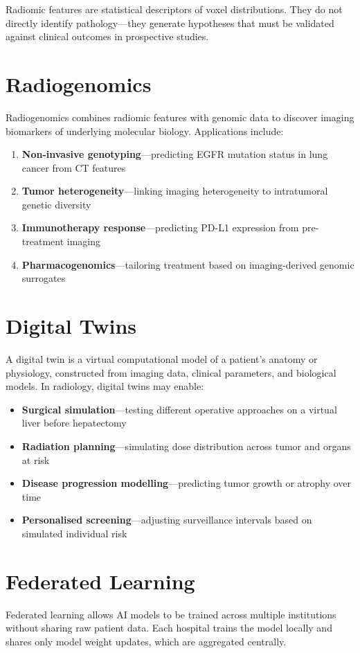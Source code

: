 \begin{pearlbox}
Radiomic features are statistical descriptors of voxel distributions. They do not directly identify pathology---they generate hypotheses that must be validated against clinical outcomes in prospective studies.
\end{pearlbox}

\section{Radiogenomics}
Radiogenomics combines radiomic features with genomic data to discover imaging biomarkers of underlying molecular biology. Applications include:
\begin{enumerate}
    \item \textbf{Non-invasive genotyping}---predicting EGFR mutation status in lung cancer from CT features
    \item \textbf{Tumor heterogeneity}---linking imaging heterogeneity to intratumoral genetic diversity
    \item \textbf{Immunotherapy response}---predicting PD-L1 expression from pre-treatment imaging
    \item \textbf{Pharmacogenomics}---tailoring treatment based on imaging-derived genomic surrogates
\end{enumerate}

\section{Digital Twins}
A digital twin is a virtual computational model of a patient's anatomy or physiology, constructed from imaging data, clinical parameters, and biological models. In radiology, digital twins may enable:
\begin{itemize}
    \item \textbf{Surgical simulation}---testing different operative approaches on a virtual liver before hepatectomy
    \item \textbf{Radiation planning}---simulating dose distribution across tumor and organs at risk
    \item \textbf{Disease progression modelling}---predicting tumor growth or atrophy over time
    \item \textbf{Personalised screening}---adjusting surveillance intervals based on simulated individual risk
\end{itemize}

\section{Federated Learning}
Federated learning allows AI models to be trained across multiple institutions without sharing raw patient data. Each hospital trains the model locally and shares only model weight updates, which are aggregated centrally.

